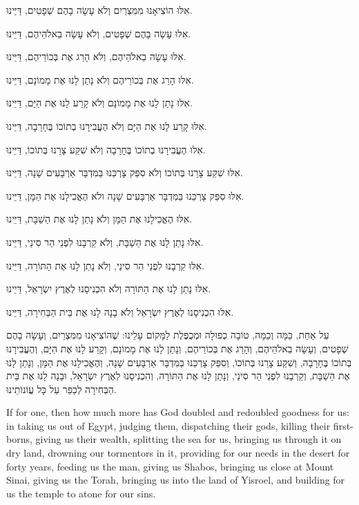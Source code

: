\begin{center}

אִלּוּ הוֹצִיאָנוּ מִמִּצְרַיִם וְלֹא עָשָׂה בָהֶם שְׁפָטִים, דַּיֵּינוּ.

אִלּוּ עָשָׂה בָהֶם שְׁפָטִים, וְלֹא עָשָׂה בֵאלֹהֵיהֶם, דַּיֵּינוּ.

אִלּוּ עָשָׂה בֵאלֹהֵיהֶם, וְלֹא הָרַג אֶת בְּכוֹרֵיהֶם, דַּיֵּינוּ.

אִלּוּ הָרַג אֶת בְּכוֹרֵיהֶם וְלֹא נָתַן לָנוּ אֶת מָמוֹנָם, דַּיֵּינוּ.

אִלּוּ נָתַן לָנוּ אֶת מָמוֹנָם וְלֹא קָרַע לָנוּ אֶת הַיָּם, דַּיֵּינוּ.

אִלּוּ קָרַע לָנוּ אֶת הַיָּם וְלֹא הֶעֱבִירָנוּ בְתוֹכוֹ בֶּחָרָבָה, דַּיֵּינוּ.

אִלּוּ הֶעֱבִירָנוּ בְתוֹכוֹ בֶּחָרָבָה וְלֹא שִׁקַּע צָרֵנוּ בְּתוֹכוֹ, דַּיֵּינוּ.

אִלּוּ שִׁקַּע צָרֵנוּ בְּתוֹכוֹ וְלֹא סִפֵּק צָרְכֵּנוּ בַּמִּדְבָּר אַרְבָּעִים שָׁנָה, דַּיֵּינוּ.

אִלּוּ סִפֵּק צָרְכֵּנוּ בַּמִּדְבָּר אַרְבָּעִים שָׁנָה ולֹא הֶאֱכִילָנוּ אֶת הַמָּן, דַּיֵּינוּ.

אִלּוּ הֶאֱכִילָנוּ אֶת הַמָּן וְלֹא נָתַן לָנוּ אֶת הַשַׁבָּת, דַּיֵּינוּ.

אִלּוּ נָתַן לָנוּ אֶת הַשַׁבָּת, וְלֹא קֵרְבָנוּ לִפְנֵי הַר סִינַי, דַּיֵּינוּ.

אִלּוּ קֵרְבָנוּ לִפְנֵי הַר סִינַי, וְלֹא נָתַן לָנוּ אֶת הַתּוֹרָה, דַּיֵּינוּ.

אִלּוּ נָתַן לָנוּ אֶת הַתּוֹרָה וְלֹא הִכְנִיסָנוּ לְאֶרֶץ יִשְׂרָאֵל, דַּיֵינוּ.

אִלּוּ הִכְנִיסָנוּ לְאֶרֶץ יִשְׂרָאֵל וְלֹא בָנָה לָנוּ אֶת בֵּית הַבְּחִירָה, דַּיֵּינוּ.
 \end{center}
 
 
 עַל אַחַת, כַּמָּה וְכַמָּה, טוֹבָה כְפוּלָה וּמְכֻפֶּלֶת לַמָּקוֹם עָלֵינוּ: שֶׁהוֹצִיאָנוּ מִמִּצְרַיִם, וְעָשָׂה בָהֶם שְׁפָטִים, וְעָשָׂה בֵאלֹהֵיהֶם, וְהָרַג אֶת בְּכוֹרֵיהֶם, וְנָתַן לָנוּ אֶת מָמוֹנָם, וְקָרַע לָנוּ אֶת הַיָּם, וְהֶעֱבִירָנוּ בְתוֹכוֹ בֶּחָרָבָה, וְשִׁקַּע צָרֵנוּ בְּתוֹכוֹ, וְסִפֵּק צָרְכֵּנוּ בַּמִּדְבָּר אַרְבָּעִים שָׁנָה, וְהֶאֱכִילָנוּ אֶת הַמָּן, וְנָתַן לָנוּ אֶת הַשַׁבָּת, וְקֵרְבָנוּ לִפְנֵי הַר סִינַי, וְנָתַן לָנוּ אֶת הַתּוֹרָה, וְהִכְנִיסָנוּ לְאֶרֶץ יִשְׂרָאֵל, וּבָנָה לָנוּ אֶת בֵּית הַבְּחִירָה לְכַפֵּר עַל כָּל עֲוֹנוֹתֵינוּ.
 
 \begin{english}
If for one, then how much more has God doubled and redoubled goodness for us: in taking us out of Egypt, judging them, dispatching their gods, killing their firstborns, giving us their wealth, splitting the sea for us, bringing us through it on dry land, drowning our tormentors in it, providing for our needs in the desert for forty years, feeding us the man, giving us Shabos, bringing us close at Mount Sinai, giving us the Torah, bringing us into the land of Yisroel, and building for us the temple to atone for our sins.
\end{english}
 
